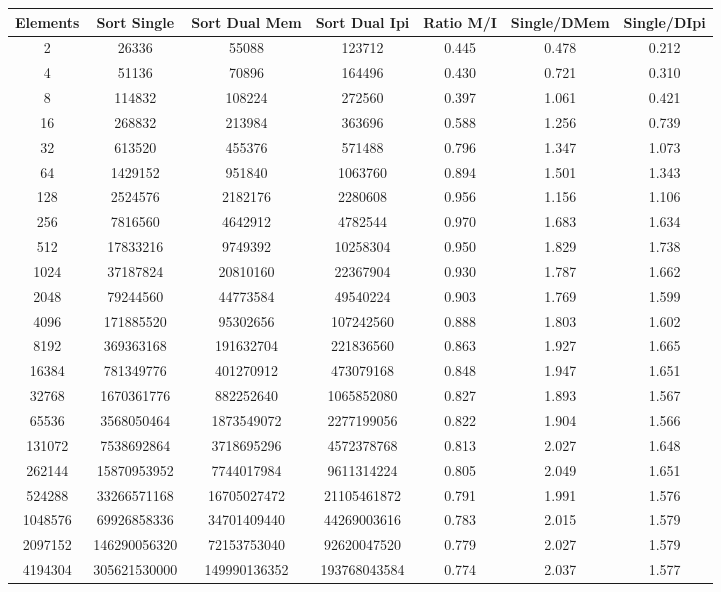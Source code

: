 \begin{center}
	\begin{tabular}{|c|c|c|c|c|c|c|}
		\hline	
			Elements & Sort Single & Sort Dual Mem & Sort Dual Ipi & Ratio M/I & Single/DMem & Single/DIpi\\
		\hline
			2 & 26336 & 55088 & 123712 & 0.445  & 0.478  & 0.212 \\
		\hline
			4 & 51136 & 70896 & 164496 & 0.430  & 0.721  & 0.310 \\
		\hline
			8 & 114832 & 108224 & 272560 & 0.397  & 1.061 & 0.421 \\
		\hline
			16 & 268832 & 213984 & 363696 & 0.588  & 1.256 & 0.739 \\
		\hline
			32 & 613520 & 455376 & 571488 & 0.796  & 1.347 & 1.073 \\
		\hline
			64 & 1429152 & 951840 & 1063760 & 0.894  & 1.501 & 1.343 \\
		\hline
			128 & 2524576 & 2182176 & 2280608 & 0.956  & 1.156 & 1.106 \\
		\hline
			256 & 7816560 & 4642912 & 4782544 & 0.970  & 1.683 & 1.634 \\
		\hline
			512 & 17833216 & 9749392 & 10258304 & 0.950  & 1.829 & 1.738 \\
		\hline
			1024 & 37187824 & 20810160 & 22367904 & 0.930 & 1.787 & 1.662 \\
		\hline
			2048 & 79244560 & 44773584 & 49540224 & 0.903  & 1.769 & 1.599 \\
		\hline
			4096 & 171885520 & 95302656 & 107242560 & 0.888  & 1.803 & 1.602 \\
		\hline
			8192 & 369363168 & 191632704 & 221836560 & 0.863  & 1.927 & 1.665 \\
		\hline
			16384 & 781349776 & 401270912 & 473079168 & 0.848  & 1.947 & 1.651 \\
		\hline
			32768 & 1670361776 & 882252640 & 1065852080 & 0.827  & 1.893 & 1.567 \\
		\hline
			65536 & 3568050464 & 1873549072 & 2277199056 & 0.822  & 1.904 & 1.566 \\
		\hline
			131072 & 7538692864 & 3718695296 & 4572378768 & 0.813  & 2.027 & 1.648 \\
		\hline
			262144 & 15870953952 & 7744017984 & 9611314224 & 0.805  & 2.049 & 1.651 \\
		\hline
			524288 & 33266571168 & 16705027472 & 21105461872 & 0.791  & 1.991 & 1.576 \\
		\hline
			1048576 & 69926858336 & 34701409440 & 44269003616 & 0.783  & 2.015 & 1.579 \\
		\hline
			2097152 & 146290056320 & 72153753040 & 92620047520 & 0.779  & 2.027 & 1.579 \\
		\hline
			4194304 & 305621530000 & 149990136352 & 193768043584 & 0.774  & 2.037 & 1.577 \\
		\hline
	\end{tabular}
\end{center}

